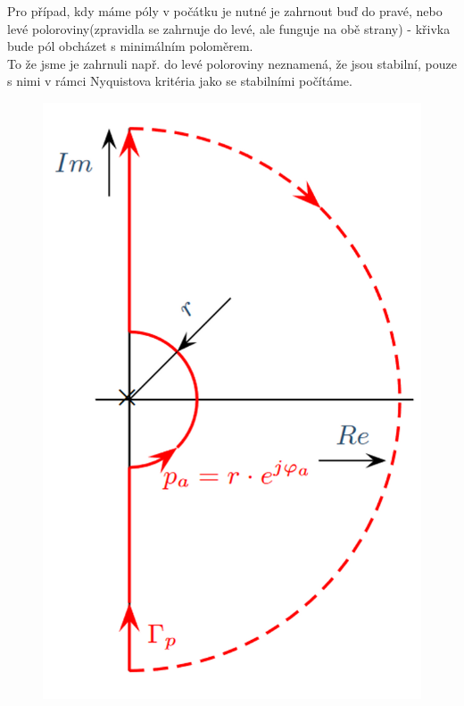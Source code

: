 Pro případ, kdy máme póly v počátku je nutné je zahrnout buď do pravé, nebo levé poloroviny(zpravidla se zahrnuje do levé, ale funguje na obě strany) - křivka bude pól obcházet s minimálním poloměrem.\\
To že jsme je zahrnuli např. do levé poloroviny neznamená, že jsou stabilní, pouze s nimi v rámci Nyquistova kritéria jako se stabilními počítáme.\\
\begin{figure}[H]
    \includegraphics*[scale = 0.15]{images/NyQuistPocatek.png}
\end{figure}

